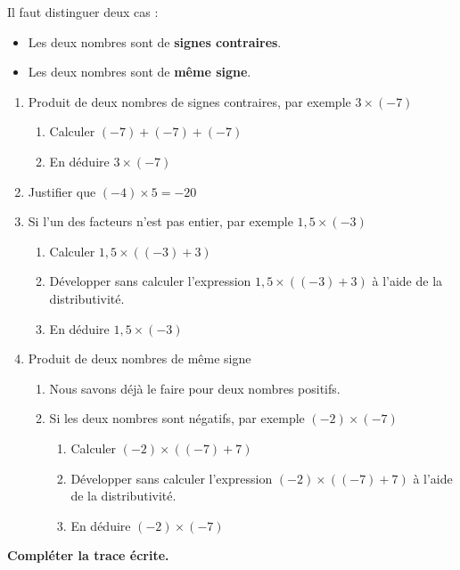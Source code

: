 \begin{activite}   
    Il faut distinguer deux cas :
    \begin{itemize}
        \item Les deux nombres sont de \textbf{signes contraires}.
        \item Les deux nombres sont de \textbf{même signe}.
    \end{itemize}

    \begin{enumerate}
        \item Produit de deux nombres de signes contraires, par exemple $3\times(-7)$
        \begin{enumerate}
            \item Calculer $(-7)+(-7)+(-7)$
            \item En déduire $3\times (-7)$
        \end{enumerate}
        \item Justifier que $(-4)\times 5=-20$
        \item Si l'un des facteurs n'est pas entier, par exemple $1,5\times (-3)$
        \begin{enumerate}
            \item Calculer $1,5\times ((-3)+3)$
            \item Développer sans calculer l'expression $1,5\times ((-3)+3)$ à l'aide de la distributivité.
            \item En déduire $1,5\times (-3)$
        \end{enumerate}
        \item Produit de deux nombres de même signe
        \begin{enumerate}
            \item Nous savons déjà le faire pour deux nombres positifs.
            \item Si les deux nombres sont négatifs, par exemple $(-2)\times (-7)$
            \begin{enumerate}
                \item Calculer $(-2)\times ((-7)+7)$
                \item Développer sans calculer l'expression $(-2)\times ((-7)+7)$ à l'aide de la distributivité.
                \item En déduire $(-2)\times (-7)$
            \end{enumerate}
        \end{enumerate}
    \end{enumerate}

    \textbf{Compléter la trace écrite.}
\end{activite}
